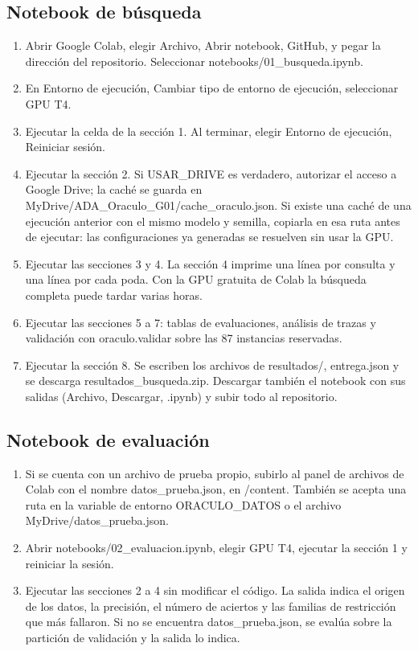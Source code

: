 \documentclass[12pt,letterpaper]{article}
\theoremstyle{definition}
\begin{document}
\subsection{Notebook de búsqueda}
\begin{enumerate}[leftmargin=*]
\item Abrir Google Colab, elegir Archivo, Abrir notebook, GitHub, y pegar la dirección del repositorio. Seleccionar notebooks/01\_busqueda.ipynb.
\item En Entorno de ejecución, Cambiar tipo de entorno de ejecución, seleccionar GPU T4.
\item Ejecutar la celda de la sección 1. Al terminar, elegir Entorno de ejecución, Reiniciar sesión.
\item Ejecutar la sección 2. Si USAR\_DRIVE es verdadero, autorizar el acceso a Google Drive; la caché se guarda en MyDrive/ADA\_Oraculo\_G01/cache\_oraculo.json. Si existe una caché de una ejecución anterior con el mismo modelo y semilla, copiarla en esa ruta antes de ejecutar: las configuraciones ya generadas se resuelven sin usar la GPU.
\item Ejecutar las secciones 3 y 4. La sección 4 imprime una línea por consulta y una línea por cada poda. Con la GPU gratuita de Colab la búsqueda completa puede tardar varias horas.
\item Ejecutar las secciones 5 a 7: tablas de evaluaciones, análisis de trazas y validación con oraculo.validar sobre las 87 instancias reservadas.
\item Ejecutar la sección 8. Se escriben los archivos de resultados/, entrega.json y se descarga resultados\_busqueda.zip. Descargar también el notebook con sus salidas (Archivo, Descargar, .ipynb) y subir todo al repositorio.
\end{enumerate}

\subsection{Notebook de evaluación}
\begin{enumerate}[leftmargin=*]
\item Si se cuenta con un archivo de prueba propio, subirlo al panel de archivos de Colab con el nombre datos\_prueba.json, en /content. También se acepta una ruta en la variable de entorno ORACULO\_DATOS o el archivo MyDrive/datos\_prueba.json.
\item Abrir notebooks/02\_evaluacion.ipynb, elegir GPU T4, ejecutar la sección 1 y reiniciar la sesión.
\item Ejecutar las secciones 2 a 4 sin modificar el código. La salida indica el origen de los datos, la precisión, el número de aciertos y las familias de restricción que más fallaron. Si no se encuentra datos\_prueba.json, se evalúa sobre la partición de validación y la salida lo indica.
\end{enumerate}
\end{document}
